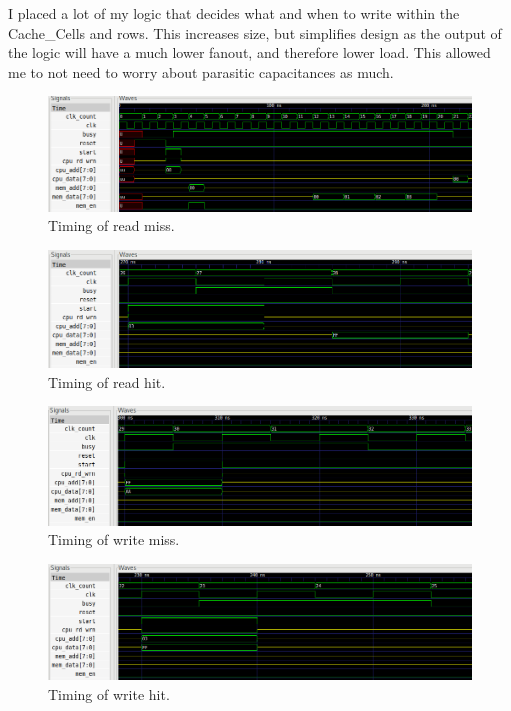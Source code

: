 \documentclass[10pt]{article}
\begin{document}
I placed a lot of my logic that decides what and when to write within the
Cache_Cells and rows. This increases size, but simplifies design as the output
of the logic will have a much lower fanout, and therefore lower load. This
allowed me to not need to worry about parasitic capacitances as much. 

\begin{figure}
    \centering
    \includegraphics[width=\textwidth]{chiprm.png}
    \caption{Timing of read miss.}
    \label{chiprm}
\end{figure}

\begin{figure}
    \centering
    \includegraphics[width=\textwidth]{chiprh.png}
    \caption{Timing of read hit.}
    \label{chiprh}
\end{figure}
\begin{figure}
    \centering
    \includegraphics[width=\textwidth]{chipwm.png}
    \caption{Timing of write miss.}
    \label{chipwm}
\end{figure}
\begin{figure}
    \centering
    \includegraphics[width=\textwidth]{chipwh.png}
    \caption{Timing of write hit.}
    \label{chipwh}
\end{figure}
\end{document}
